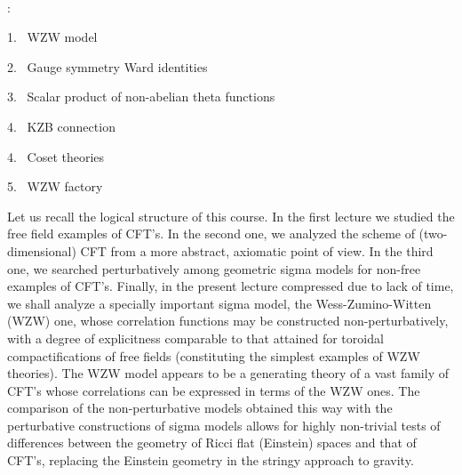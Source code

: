 \
\vskip 0.8cm
\addtocounter{equation}{-46}
\vskip 0.8cm
:
\vskip 0.5cm

1. \ WZW model

2. \ Gauge symmetry Ward identities

3. \ Scalar product of non-abelian theta functions

4. \ KZB connection

4. \ Coset theories

5. \ WZW factory

\vs 1.7cm

Let us recall the logical structure of this course.
In the first lecture we studied the free field
examples of CFT's. In the second one,
we analyzed the scheme of (two-dimensional)
CFT from a more abstract, axiomatic
point of view. In the third one, we searched
perturbatively among geometric sigma models for non-free
examples of CFT's. Finally, in the present lecture
compressed due to lack of time, we shall analyze a specially important
sigma model, the Wess-Zumino-Witten (WZW) one, whose
correlation functions may be constructed non-perturbatively,
with a degree of explicitness comparable to that attained
for toroidal compactifications of free fields
(constituting the simplest examples of WZW theories).
The WZW model appears to be a generating theory
of a vast family of CFT's whose
correlations can be expressed in terms of the WZW ones.
The comparison of the non-perturbative models obtained
this way with the perturbative constructions of sigma models
allows for highly non-trivial tests of differences between
the geometry of Ricci flat (Einstein) spaces and that
of CFT's, replacing the Einstein geometry
in the stringy approach to gravity.
\vskip 1cm

\vskip 0.6cm

